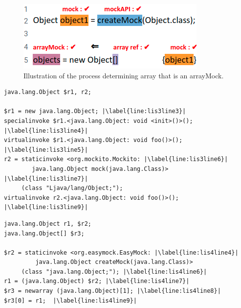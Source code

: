 \begin{figure}
    \includegraphics[width=.25\textwidth]{Images/arrayMockIllustration.png}
    
    \caption{Illustration of the process determining array that is an arrayMock.}
    \label{fig:arrayMockIllustration}
    
\end{figure}

\begin{lstlisting}[basicstyle=\ttfamily, caption={Jimple Intermediate Representation for the code in Figure~\ref{fig:mockMethodIllustration}.},
basicstyle=\scriptsize\ttfamily, captionpos=b, label=lis:mockMethodIllustrationIR, escapechar=|, morekeywords={@Test, specialinvoke, virtualinvoke, staticinvoke}]
java.lang.Object $r1, r2;

$r1 = new java.lang.Object; |\label{line:lis3line3}|
specialinvoke $r1.<java.lang.Object: void <init>()>(); |\label{line:lis3line4}|
virtualinvoke $r1.<java.lang.Object: void foo()>(); |\label{line:lis3line5}|
r2 = staticinvoke <org.mockito.Mockito: |\label{line:lis3line6}|
        java.lang.Object mock(java.lang.Class)> |\label{line:lis3line7}|
     (class "Ljava/lang/Object;");
virtualinvoke r2.<java.lang.Object: void foo()>(); |\label{line:lis3line9}|
\end{lstlisting}

\begin{lstlisting}[basicstyle=\ttfamily, caption={Jimple Intermediate Representation for the array in Figure~\ref{fig:arrayMockIllustration}.},
basicstyle=\scriptsize\ttfamily, framesep=4.5mm, framexleftmargin=1.0mm, captionpos=b, label=lis:arrayIllustrationIR, escapechar=|, morekeywords={@Test, specialinvoke, virtualinvoke, staticinvoke, newarray}]
java.lang.Object r1, $r2;
java.lang.Object[] $r3;

$r2 = staticinvoke <org.easymock.EasyMock: |\label{line:lis4line4}|
         java.lang.Object createMock(java.lang.Class)>
     (class "java.lang.Object;"); |\label{line:lis4line6}|
r1 = (java.lang.Object) $r2; |\label{line:lis4line7}|
$r3 = newarray (java.lang.Object)[1]; |\label{line:lis4line8}|
$r3[0] = r1;  |\label{line:lis4line9}|
\end{lstlisting}
